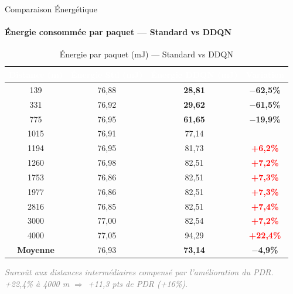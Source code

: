 \documentclass[aspectratio=169, 11pt]{beamer}
\newcommand{\cellgreen}[1]{\cellcolor{green!10}\textcolor{green!50!black}{\textbf{#1}}}
\newcommand{\cellred}[1]{\cellcolor{red!10}\textcolor{red}{\textbf{#1}}}
\newcommand{\cellneutral}[1]{\cellcolor{gray!10}{#1}}
\begin{document}
	\begin{frame}{Comparaison Énergétique}
		\framesubtitle{Énergie consommée par paquet — Standard vs DDQN}
		
		\begin{table}
			\centering
			\renewcommand{\arraystretch}{1.15}
			\fontsize{7.5}{9}\selectfont
			\begin{tabular}{|c|c|c|c|}
				\hline
				\rowcolor{blue!50}
				\textcolor{white}{\textbf{Distance (m)}} &
				\textcolor{white}{\textbf{Énergie Std (mJ)}} &
				\textcolor{white}{\textbf{Énergie DDQN (mJ)}} &
				\textcolor{white}{\textbf{Variation}} \\
				\hline
				139  & 76,88 & \textbf{28,81} & \cellgreen{$-$62,5\%} \\
				\hline
				331  & 76,92 & \textbf{29,62} & \cellgreen{$-$61,5\%} \\
				\hline
				775  & 76,95 & \textbf{61,65} & \cellgreen{$-$19,9\%} \\
				\hline
				1015 & 76,91 & 77,14 & \cellneutral{+0,3\%} \\
				\hline
				1194 & 76,95 & 81,73 & \cellred{+6,2\%} \\
				\hline
				1260 & 76,98 & 82,51 & \cellred{+7,2\%} \\
				\hline
				1753 & 76,86 & 82,51 & \cellred{+7,3\%} \\
				\hline
				1977 & 76,86 & 82,51 & \cellred{+7,3\%} \\
				\hline
				2816 & 76,85 & 82,51 & \cellred{+7,4\%} \\
				\hline
				3000 & 77,00 & 82,54 & \cellred{+7,2\%} \\
				\hline
				4000 & 77,05 & 94,29 & \cellred{+22,4\%} \\
				\hline\hline
				\rowcolor{cyan!30}
				\textbf{Moyenne} & 76,93 & \textbf{73,14} & \cellgreen{$-$4,9\%} \\
				\hline
			\end{tabular}
			\caption{Énergie par paquet (mJ) — Standard vs DDQN}
			\label{tab:comparaison_energie}
		\end{table}
		
		{\footnotesize\textcolor{gray}{\itshape
				Surcoût aux distances intermédiaires compensé par l'amélioration du PDR.
				+22,4\% à 4000 m $\Rightarrow$ +11,3 pts de PDR (+16\%).}}
	\end{frame}
	
\end{document}
